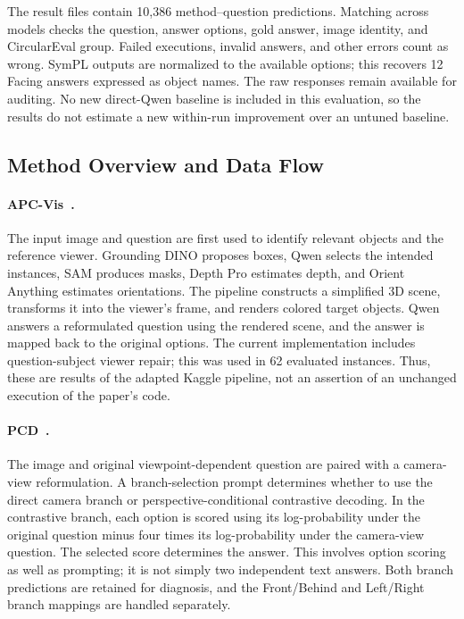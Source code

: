 \documentclass[runningheads]{llncs}
\begin{document}
The result files contain 10,386 method--question predictions. Matching across models checks the question, answer options, gold answer, image identity, and CircularEval group. Failed executions, invalid answers, and other errors count as wrong. SymPL outputs are normalized to the available options; this recovers 12 Facing answers expressed as object names. The raw responses remain available for auditing. No new direct-Qwen baseline is included in this evaluation, so the results do not estimate a new within-run improvement over an untuned baseline.

\subsection{Method Overview and Data Flow}

\paragraph{APC-Vis~\cite{lee2025perspective}.}
The input image and question are first used to identify relevant objects and the reference viewer. Grounding DINO proposes boxes, Qwen selects the intended instances, SAM produces masks, Depth Pro estimates depth, and Orient Anything estimates orientations. The pipeline constructs a simplified 3D scene, transforms it into the viewer's frame, and renders colored target objects. Qwen answers a reformulated question using the rendered scene, and the answer is mapped back to the original options. The current implementation includes question-subject viewer repair; this was used in 62 evaluated instances. Thus, these are results of the adapted Kaggle pipeline, not an assertion of an unchanged execution of the paper's code.

\paragraph{PCD~\cite{chung-yoon-2026-improving}.}
The image and original viewpoint-dependent question are paired with a camera-view reformulation. A branch-selection prompt determines whether to use the direct camera branch or perspective-conditional contrastive decoding. In the contrastive branch, each option is scored using its log-probability under the original question minus four times its log-probability under the camera-view question. The selected score determines the answer. This involves option scoring as well as prompting; it is not simply two independent text answers. Both branch predictions are retained for diagnosis, and the Front/Behind and Left/Right branch mappings are handled separately.
\end{document}
